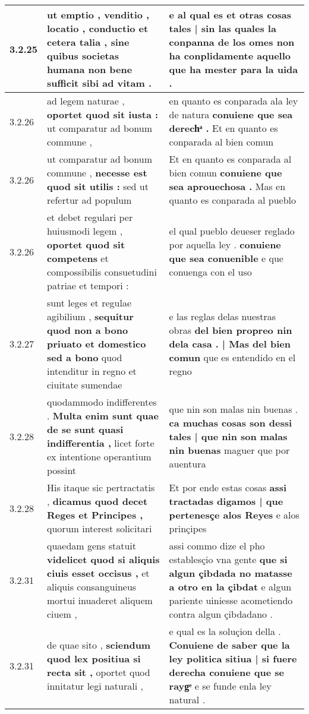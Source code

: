 \begin{tabular}{|p{1cm}|p{6.5cm}|p{6.5cm}|}
3.2.25 & ut emptio , venditio , locatio , conductio et cetera talia , \textbf{ sine quibus societas humana } non bene sufficit sibi ad vitam . & e al qual es \textbf{ et otras cosas tales | sin las quales la conpanna de los omes non ha conplidamente } aquello que ha mester para la uida . \\\hline
3.2.26 & ad legem naturae , \textbf{ oportet quod sit iusta : } ut comparatur ad bonum commune , & en quanto es conparada ala ley de natura \textbf{ conuiene que sea derechͣ . } Et en quanto es conparada al bien comun \\\hline
3.2.26 & ut comparatur ad bonum commune , \textbf{ necesse est quod sit utilis : } sed ut refertur ad populum & Et en quanto es conparada al bien comun \textbf{ conuiene que sea aprouechosa . } Mas en quanto es conparada al pueblo \\\hline
3.2.26 & et debet regulari per huiusmodi legem , \textbf{ oportet quod sit competens } et compossibilis consuetudini patriae et tempori : & el qual pueblo deueser reglado por aquella ley . \textbf{ conuiene que sea conuenible } e que conuenga con el uso \\\hline
3.2.27 & sunt leges et regulae agibilium , \textbf{ sequitur quod non a bono priuato et domestico sed a bono } quod intenditur in regno et ciuitate sumendae & e las reglas delas nuestras obras \textbf{ del bien propreo nin dela casa . | Mas del bien comun } que es entendido en el regno \\\hline
3.2.28 & quodammodo indifferentes . \textbf{ Multa enim sunt quae de se sunt quasi indifferentia , } licet forte ex intentione operantium possint & que nin son malas nin buenas . \textbf{ ca muchas cosas son dessi tales | que nin son malas nin buenas } maguer que por auentura \\\hline
3.2.28 & His itaque sic pertractatis , \textbf{ dicamus quod decet Reges et Principes , } quorum interest solicitari & Et por ende estas cosas \textbf{ assi tractadas digamos | que pertenesçe alos Reyes } e alos prinçipes \\\hline
3.2.31 & quaedam gens statuit \textbf{ videlicet quod si aliquis ciuis esset occisus , } et aliquis consanguineus mortui inuaderet aliquem ciuem , & assi commo dize el pho establesçio vna gente \textbf{ que si algun çibdada no matasse a otro en la çibdat } e algun pariente uiniesse acometiendo contra algun çibdadano . \\\hline
3.2.31 & de quae sito , \textbf{ sciendum quod lex positiua si recta sit , } oportet quod innitatur legi naturali , & e qual es la soluçion della . \textbf{ Conuiene de saber que la ley politica sitiua | si fuere derecha conuiene que se raygͤ } e se funde enla ley natural . \\\hline

\end{tabular}
